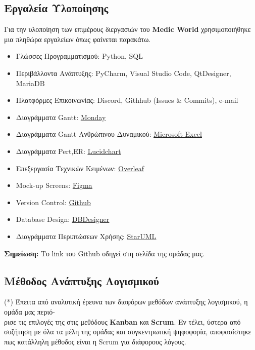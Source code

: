 \documentclass{article}
\begin{document}
\subsection{Εργαλεία Υλοποίησης}

Για την υλοποίηση των επιμέρους διεργασιών του \textbf{Medic World} χρησιμοποιήθηκε μια πληθώρα εργαλείων όπως φαίνεται παρακάτω.


\begin{itemize}
    \item Γλώσσες Προγραμματισμού: Python, SQL
    \item Περιβάλλοντα Ανάπτυξης: PyCharm, Visual Studio Code, QtDesigner, MariaDB
    \item Πλατφόρμες Επικοινωνίας: Discord, Githhub (Issues \& Commits), e-mail
    \item Διαγράμματα Gantt: \underline{\href{https://www.monday.com}{Monday}}
    \item Διαγράμματα Gantt Ανθρώπινου Δυναμικού: \underline{\href{https://microsoft-excel.en.softonic.com/}{Microsoft Excel}}
    \item Διαγράμματα Pert,ER: \underline{\href{https://lucid.app}{Lucidchart}}
    \item Επεξεργασία Τεχνικών Κειμένων: \underline{\href{https://www.overleaf.com}{Overleaf}}
    \item Mock-up Screens: \underline{\href{https://www.figma.com}{Figma}}
    \item Version Control: \underline{\href{https://github.com/mstephanidhs/Software-Engineering}{Github}}
    \item Database Design: \underline{\href{www.dbdesigner.net}{DBDesigner}}
    \item Διαγράμματα Περιπτώσεων Χρήσης: \underline{\href{https://staruml.io/download}{StarUML}}

\end{itemize}

\vspace{0.3cm}

\textbf{Σημείωση:} Το link του Github οδηγεί στη σελίδα της ομάδας μας.
 

\subsection{Μέθοδος Ανάπτυξης Λογισμικού}

(*) Έπειτα από αναλυτική έρευνα των διαφόρων μεθόδων ανάπτυξης λογισμικού, η ομάδα μας περιό-\\ρισε τις επιλογές της στις μεθόδους \textbf{Kanban} και \textbf{Scrum}. Εν τέλει, ύστερα από συζήτηση με όλα τα μέλη της ομάδας και συγκεντρωτική ψηφοφορία, αποφασίστηκε πως κατάλληλη μέθοδος είναι η Scrum για διάφορους λόγους. \newline \par
\end{document}
